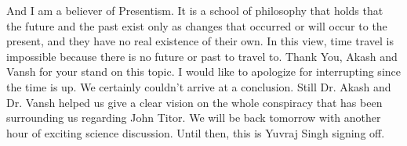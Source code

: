 \begin{drama}
    \sconespeaks And I am a believer of Presentism. It is a school of philosophy that holds that the future and the past exist only as changes that occurred or will occur to the present, and they have no real existence of their own. In this view, time travel is impossible because there is no future or past to travel to.
    \repspeaks Thank You, Akash and Vansh for your stand on this topic. I would like to apologize for interrupting since the time is up.
    \repspeaks We certainly couldn't arrive at a conclusion. Still Dr. Akash and Dr. Vansh helped us give a clear vision on the whole conspiracy that has been surrounding us regarding John Titor.
    We will be back tomorrow with another hour of exciting science discussion. Until then, this is Yuvraj Singh signing off.

\end{drama}

